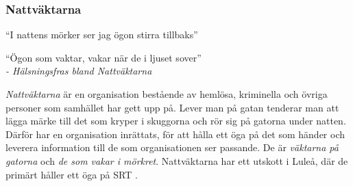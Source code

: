 \subsubsection{Nattväktarna}
``I nattens mörker ser jag ögon stirra tillbaks''
\begin{FlushRight}
	``Ögon som vaktar, vakar när de i ljuset sover'' \\
	\textit{- Hälsningsfras bland Nattväktarna}
\end{FlushRight}

\textit{Nattväktarna} är en organisation bestående av hemlösa, kriminella och övriga personer som samhället har gett 
upp på. Lever man på gatan tenderar man att lägga märke till det som kryper i skuggorna och rör sig på gatorna under 
natten. Därför har en organisation inrättats, för att hålla ett öga på det som händer och leverera information till
de som organisationen ser passande. De är \textit{väktarna på gatorna} och \textit{de som vakar i mörkret}.
Nattväktarna har ett utskott i Luleå, där de primärt håller ett öga på SRT \sectiondescribe{\ref{loc:SRT}}.
